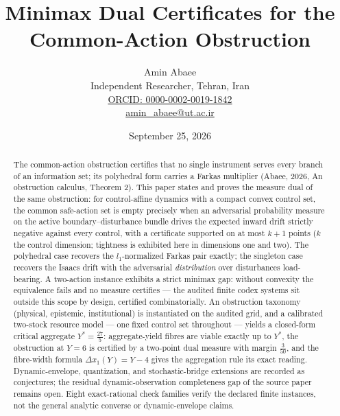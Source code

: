 \documentclass[10pt,twocolumn]{article}
\theoremstyle{definition}
\begin{document}
\title{Minimax Dual Certificates for the\\ Common-Action Obstruction}
\author{Amin Abaee\\[0.35em]
{\small Independent Researcher, Tehran, Iran}\\[0.55em]
{\small\href{https://orcid.org/0000-0002-0019-1842}{ORCID: 0000-0002-0019-1842}}\\[0.3em]
{\small\href{mailto:amin\_abaee@ut.ac.ir}{amin\_abaee@ut.ac.ir}}}
\date{September 25, 2026}
\maketitle

\begin{abstract}
The common-action obstruction certifies that no single instrument serves
every branch of an information set; its polyhedral form carries a Farkas
multiplier (Abaee, 2026, An obstruction calculus, Theorem 2). This paper states and proves the
measure dual of the same obstruction: for control-affine dynamics with a
compact convex control set, the common safe-action set is empty precisely
when an adversarial probability measure on the active
boundary--disturbance bundle drives the expected inward drift strictly
negative against every control, with a certificate supported on at most
$k+1$ points ($k$ the control dimension; tightness is exhibited here in dimensions one and two). The
polyhedral case recovers the $l_1$-normalized Farkas pair exactly; the
singleton case recovers the Isaacs drift with the adversarial
\emph{distribution} over disturbances load-bearing. A two-action instance
exhibits a strict minimax gap: without convexity the equivalence fails and
no measure certifies --- the audited finite codex systems sit outside this
scope by design, certified combinatorially. An obstruction taxonomy
(physical, epistemic, institutional) is instantiated on the audited grid,
and a calibrated two-stock resource model --- one fixed control set
throughout --- yields a closed-form critical aggregate
$Y^{*} = \tfrac{27}{5}$: aggregate-yield fibres are viable exactly up to
$Y^{*}$, the obstruction at $Y = 6$ is certified by a two-point dual
measure with margin $\tfrac{3}{50}$, and the fibre-width formula
$\Delta x_{1}(Y) = Y - 4$ gives the aggregation rule its exact reading.
Dynamic-envelope, quantization, and stochastic-bridge extensions are
recorded as conjectures; the residual dynamic-observation completeness gap
of the source paper remains open. Eight exact-rational check families verify the declared finite
instances, not the general analytic converse or dynamic-envelope claims.
\end{abstract}
\end{document}
